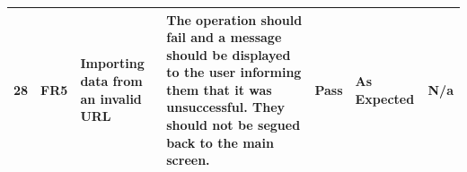 \documentclass[paper=a4, fontsize=11pt]{scrartcl}	%
\numberwithin{equation}{section}															%
\numberwithin{figure}{section}																%
\numberwithin{table}{section}
\begin{document}
\begin{landscape}
\begin{longtable}{|l|p{2cm}|p{5cm}|p{5cm}|l|p{5cm}|p{5cm}|}
28 & FR5                    & Importing data from an invalid URL                   & The operation should fail and a message should be displayed to the user informing them that it was unsuccessful. They should not be segued back to the main screen.                                                                        & Pass      & As Expected                                        & N/a                                                                                                                                                                                                                        \\ \hline
                                                                                                                                                                                                                      
\end{longtable}


\end{landscape}

\clearpage


\end{document}
